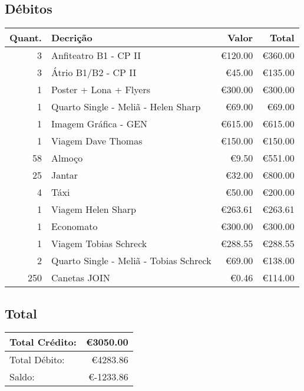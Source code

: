 \subsection{Débitos}
\begin{tabular}{| r | l | r | r |}

\hline
\textbf{Quant.}	&	\textbf{Decrição}		&	\textbf{Valor}	&	\textbf{Total}		 \\ \hline
3	&	Anfiteatro B1 - CP II				&	\euro 120.00	&	\euro 360.00 \\ \hline
3	&	Átrio B1/B2 - CP II					&	\euro 45.00		&	\euro 135.00 \\ \hline
1	&	Poster + Lona + Flyers				&	\euro 300.00	&	\euro 300.00 \\ \hline
1	&	Quarto Single - Meliã - Helen Sharp	&	\euro 69.00		&	\euro 69.00  \\ \hline
1	&	Imagem Gráfica - GEN				&	\euro 615.00	&	\euro 615.00 \\ \hline
1	&	Viagem Dave Thomas					&	\euro 150.00	&	\euro 150.00 \\ \hline
58	&	Almoço								&	\euro 9.50		&	\euro 551.00 \\ \hline
25	&	Jantar								&	\euro 32.00		&	\euro 800.00 \\ \hline
4	&	Táxi								&	\euro 50.00		&	\euro 200.00 \\ \hline
1	&	Viagem Helen Sharp					&	\euro 263.61	&	\euro 263.61 \\ \hline
1	&	Economato							&	\euro 300.00	&	\euro 300.00 \\ \hline
1	&	Viagem Tobias Schreck				&	\euro 288.55	&	\euro 288.55 \\ \hline
2	&	Quarto Single - Meliã - Tobias Schreck & \euro 69.00	&	\euro 138.00 \\ \hline
250 &	Canetas JOIN						&	\euro 0.46		&	\euro 114.00 \\ \hline
\end{tabular}

\subsection{Total}
\begin{tabular}{| l | r |}

\hline
Total Crédito:	&	\euro 3050.00	\\ \hline
Total Débito:	&	\euro 4283.86	\\ \hline
Saldo:			&	\euro -1233.86	\\ \hline
\end{tabular}

